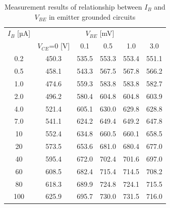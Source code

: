 \documentclass[a4paper,10pt]{jsarticle}
\begin{document}
\begin{table}[H]
  \centering
  \caption{Measurement results of relationship between $I_B$ and $V_{BE}$ in emitter grounded circuits}
    \begin{tabular}{cccccc}
    $I_B$ [µA] & \multicolumn{5}{c}{$V_{BE}$ [mV]} \\
          & $V_{CE}$=0 [V] & 0.1   & 0.5   & 1.0   & 3.0 \\
    \midrule
    \midrule
    0.2   & 450.3 & 535.5 & 553.3 & 553.4 & 551.1 \\
    0.5   & 458.1 & 543.3 & 567.5 & 567.8 & 566.2 \\
    1.0   & 474.6 & 559.3 & 583.8 & 583.8 & 582.7 \\
    2.0   & 496.2 & 580.4 & 604.8 & 604.8 & 603.9 \\
    4.0   & 521.4 & 605.1 & 630.0 & 629.8 & 628.8 \\
    7.0   & 541.1 & 624.2 & 649.4 & 649.2 & 647.8 \\
    10    & 552.4 & 634.8 & 660.5 & 660.1 & 658.5 \\
    20    & 573.5 & 653.6 & 681.0 & 680.4 & 677.0 \\
    40    & 595.4 & 672.0 & 702.4 & 701.6 & 697.0 \\
    60    & 608.5 & 682.4 & 715.4 & 714.5 & 708.2 \\
    80    & 618.3 & 689.9 & 724.8 & 724.1 & 715.5 \\
    100   & 625.9 & 695.7 & 730.0 & 731.5 & 716.0 \\
    \end{tabular}%
  \label{tab:addlabel}%
\end{table}%
\end{document}
